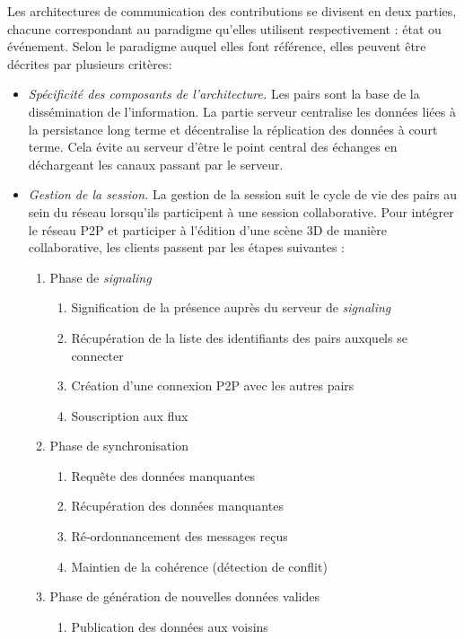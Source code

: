 Les architectures de communication des contributions se divisent en deux parties, 
chacune correspondant au paradigme qu'elles utilisent respectivement : état ou 
événement. Selon le paradigme auquel elles font référence, elles peuvent 
être décrites par plusieurs critères:

\begin{itemize}
	\item \textit{Spécificité des composants de l'architecture.} Les pairs sont la 
	base de la 
	dissémination de l'information. La partie serveur 
	centralise les données liées à la persistance long  terme et
	décentralise la réplication des données à court terme. Cela évite au 
	serveur 
	d'être le point central des échanges en déchargeant les canaux passant par le 
	serveur.
	\item \textit{Gestion de la session.} 
	La gestion de la session suit le cycle de vie des pairs au sein du réseau 
	lorsqu'ils participent à une session collaborative. 
	Pour intégrer le réseau \gls{P2P} et participer à l'édition d'une scène \gls{3D} de 
	manière collaborative, les clients passent par les étapes suivantes :
		\begin{enumerate}
		\item Phase de \textit{signaling}
		\label{phase1signaling}
		\begin{enumerate}
			\item Signification de la présence auprès du serveur de \textit{signaling}
			\item Récupération de la liste des identifiants des pairs auxquels se 
			connecter
			\item Création d'une connexion \gls{P2P} avec les autres pairs
			\item Souscription aux flux
			
		\end{enumerate}
		\item Phase de synchronisation
		\label{phase2sync}
		\begin{enumerate}
			\item Requête des données manquantes
			\item Récupération des données manquantes
			\item Ré-ordonnancement des messages reçus
			\item Maintien de la cohérence (détection de conflit)
		\end{enumerate}
		
		\item Phase de génération de nouvelles données valides 
		\label{phase3gen}
		\begin{enumerate}
			\item Publication des données aux voisins
		\end{enumerate}
		

\end{enumerate}
\end{itemize}
